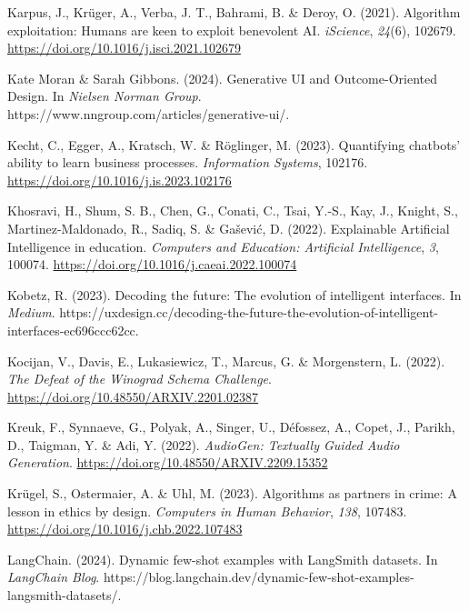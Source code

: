 \documentclass[
  letterpaper,
  DIV=11,
  numbers=noendperiod]{scrartcl}
\newlength{\cslhangindent}
\newenvironment{CSLReferences}[2] %
 {\begin{list}{}{%
  \setlength{\itemindent}{0pt}
  \setlength{\leftmargin}{0pt}
  \setlength{\parsep}{0pt}
  \ifodd #1
   \setlength{\leftmargin}{\cslhangindent}
   \setlength{\itemindent}{-1\cslhangindent}
  \fi
  \setlength{\itemsep}{#2\baselineskip}}}
 {\end{list}}
\begin{document}
\begin{CSLReferences}{1}{0}
Karpus, J., Krüger, A., Verba, J. T., Bahrami, B. \& Deroy, O. (2021).
Algorithm exploitation: {Humans} are keen to exploit benevolent {AI}.
\emph{iScience}, \emph{24}(6), 102679.
\url{https://doi.org/10.1016/j.isci.2021.102679}

Kate Moran \& Sarah Gibbons. (2024). Generative {UI} and
{Outcome-Oriented Design}. In \emph{Nielsen Norman Group}.
https://www.nngroup.com/articles/generative-ui/.

Kecht, C., Egger, A., Kratsch, W. \& Röglinger, M. (2023). Quantifying
chatbots' ability to learn business processes. \emph{Information
Systems}, 102176. \url{https://doi.org/10.1016/j.is.2023.102176}

Khosravi, H., Shum, S. B., Chen, G., Conati, C., Tsai, Y.-S., Kay, J.,
Knight, S., Martinez-Maldonado, R., Sadiq, S. \& Gašević, D. (2022).
Explainable {Artificial Intelligence} in education. \emph{Computers and
Education: Artificial Intelligence}, \emph{3}, 100074.
\url{https://doi.org/10.1016/j.caeai.2022.100074}

Kobetz, R. (2023). Decoding the future: The evolution of intelligent
interfaces. In \emph{Medium}.
https://uxdesign.cc/decoding-the-future-the-evolution-of-intelligent-interfaces-ec696ccc62cc.

Kocijan, V., Davis, E., Lukasiewicz, T., Marcus, G. \& Morgenstern, L.
(2022). \emph{The {Defeat} of the {Winograd Schema Challenge}}.
\url{https://doi.org/10.48550/ARXIV.2201.02387}

Kreuk, F., Synnaeve, G., Polyak, A., Singer, U., Défossez, A., Copet,
J., Parikh, D., Taigman, Y. \& Adi, Y. (2022). \emph{{AudioGen}:
{Textually Guided Audio Generation}}.
\url{https://doi.org/10.48550/ARXIV.2209.15352}

Krügel, S., Ostermaier, A. \& Uhl, M. (2023). Algorithms as partners in
crime: {A} lesson in ethics by design. \emph{Computers in Human
Behavior}, \emph{138}, 107483.
\url{https://doi.org/10.1016/j.chb.2022.107483}

LangChain. (2024). Dynamic few-shot examples with {LangSmith} datasets.
In \emph{LangChain Blog}.
https://blog.langchain.dev/dynamic-few-shot-examples-langsmith-datasets/.


\end{CSLReferences}
\end{document}
